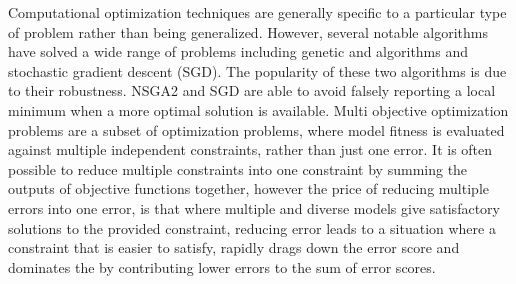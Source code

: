 \begin{itemize}
Computational optimization techniques are generally specific to a particular type of problem rather than being generalized. However, several notable algorithms have solved a wide range of problems including genetic and algorithms and stochastic gradient descent (SGD). The popularity of these two algorithms is due to their robustness. NSGA2 and SGD are able to avoid falsely reporting a local minimum when a more optimal solution is available. 
 Multi objective optimization problems are a subset of optimization problems, where model fitness is evaluated against multiple independent constraints, rather than just one error. It is often possible to reduce multiple constraints into one constraint by summing the outputs of objective functions together, however the price of reducing multiple errors into one error, is that where multiple and diverse models give satisfactory solutions to the provided constraint, reducing error leads to a situation where a constraint that is easier to satisfy, rapidly drags down the error score and dominates the by contributing lower errors to the sum of error scores.


\end{itemize}
